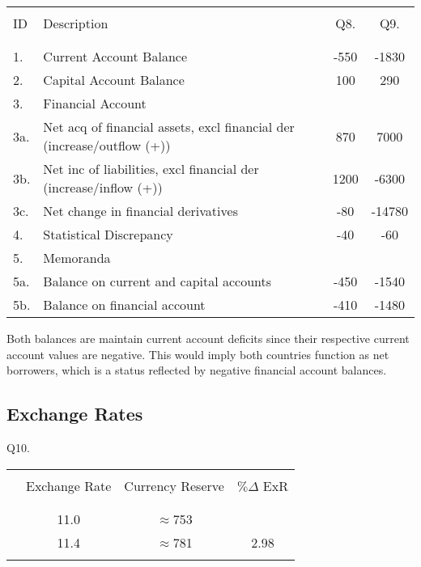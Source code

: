 \documentclass[12pt]{article}
\begin{document}
\begin{table}[!h]
	\centering
	\begin{tabular}[t]{l l c c  }
		\hline
		&&&\\
		ID & Description & Q8.  & Q9. \\
		&&&\\
		\hline
		&&&\\
		1. & Current Account Balance & -550 & -1830 \\
		2. & Capital Account Balance & 100 & 290 \\
		3. & Financial Account	&  & \\
		3a. & Net acq of financial assets, excl financial der (increase/outflow (+))& 870 & 7000\\
		3b. & Net inc of liabilities, excl financial der (increase/inflow (+))	& 1200 & -6300 \\
		3c. & Net change in financial derivatives & -80 & -14780 \\
		4. & Statistical Discrepancy & -40 & -60 \\
		5. & Memoranda & & \\
		5a. & Balance on current and capital accounts & -450 & -1540 \\
		5b. & Balance on financial account & -410  & -1480\\
		\hline
	\end{tabular}
\end{table}

Both balances are maintain current account deficits since their respective current account values are negative.
This would imply both countries function as net borrowers, which is a status reflected by negative financial account balances.


\newpage

\subsection*{Exchange Rates}

\bigskip
\bigskip
\bigskip
\bigskip

\noindent Q10.
\begin{table}[!h]
	\centering
	\begin{tabular}[t]{l c c c }
		\hline
		&&&\\
		& Exchange Rate & Currency Reserve & $\%\Delta$ ExR  \\
		&	&&\\
		\hline
		&&&\\
		& 11.0 & $\approx$753 &   \\
		& 11.4 & $\approx$781  &  2.98\\
		&&&\\
		\hline
	\end{tabular}
\end{table}
\end{document}
